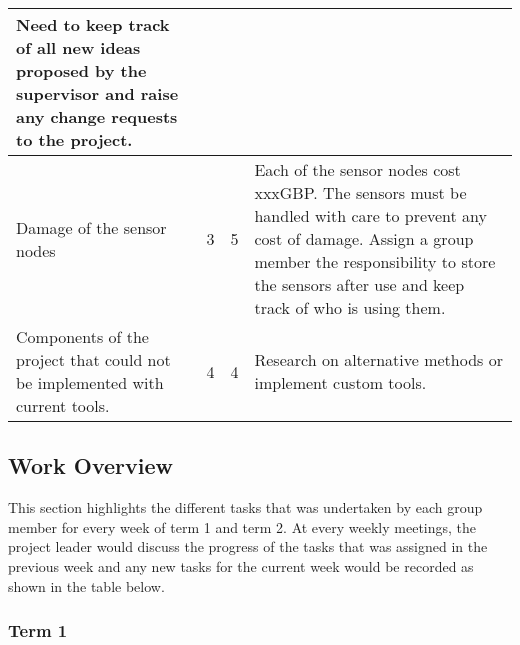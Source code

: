 \begin{center}
\begin{longtable}{| p{4cm} | l | l | p{7cm} |}
Need to keep track of all new ideas proposed by the supervisor and raise any change requests to the project.

		\\ \hline
		
	Damage of the sensor nodes
	& 3 & 5 & Each of the sensor nodes cost xxxGBP. The sensors must be handled with care to prevent any cost of damage. Assign a group member the responsibility to store the sensors after use and keep track of who is using them.
	
		\\ \hline
		
	Components of the project that could not be implemented with current tools.
	& 4 & 4 & Research on alternative methods or implement custom tools.
	\\ \hline		
		
	\end{longtable}

\end{center}

\subsection{Work Overview}

This section highlights the different tasks that was undertaken by each group member for every week of term 1 and term 2. At every weekly meetings, the project leader would discuss the progress of the tasks that was assigned in the previous week and any new tasks for the current week would be recorded as shown in the table below.

\subsubsection*{Term 1}

